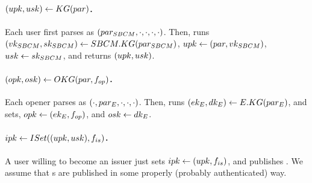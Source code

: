 \paragraph{$(upk,usk) \gets KG(par)$.} %
Each user first parses \parm as $(par_{SBCM},\cdot,\cdot,\cdot,\cdot)$.
Then, runs $(vk_{SBCM},sk_{SBCM}) \gets SBCM.KG(par_{SBCM})$, $upk \gets (par,
vk_{SBCM})$, $usk \gets sk_{SBCM}$, and returns $(upk,usk)$.

\paragraph{$(opk,osk) \gets OKG(par,f_{op})$.} %
Each opener parses \parm as $(\cdot,par_{E},\cdot,\cdot,\cdot)$.
Then, runs $(ek_{E},dk_{E}) \gets E.KG(par_{E})$, and sets, $opk \gets (ek_{E},
f_{op})$, and $osk \gets dk_{E}$.

\paragraph{$ipk \gets ISet((upk,usk),f_{is})$.} %
A user willing to become an issuer just sets $ipk \gets (upk,f_{is})$, and
publishes \ipk. We assume that {\ipk}s are published in some properly (probably
authenticated) way.

